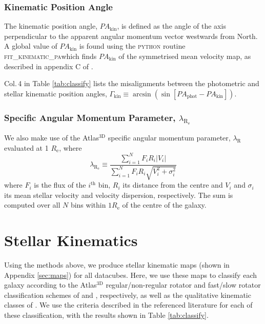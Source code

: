 \documentclass[a4paper,fleqn,usenatbib]{mnras}
\begin{document}
		\subsubsection{Kinematic Position Angle}
			\label{subsubsec:KinPA}
			The kinematic position angle, $PA_\text{kin}$, is defined as the angle of the axis perpendicular to the apparent angular momentum vector westwards from North. A global value of $PA_\text{kin}$ is found using the \textsc{python} routine \textsc{fit\_kinematic\_pa}\footnotemark[1] which finds $PA_\text{kin}$ of the symmetrised mean velocity map, as described in appendix C of \citet{Krajnovic2006}. %

			Col.\,4 in Table \ref{tab:classify} lists the misalignments between the photometric and stellar kinematic position angles, $\Gamma_\text{kin} \equiv \arcsin(\sin[PA_\text{phot} - PA_\text{kin}])$.

		\subsubsection{Specific Angular Momentum Parameter, $\lambda_\mathrm{R_e}$}
			We also make use of the Atlas$^\text{3D}$ specific angular momentum parameter, $\lambda_\text{R}$ \citep{Emsellem2007} evaluated at 1 $R_\text{e}$, where 
			\begin{equation}
				\lambda_\mathrm{R_e} \equiv \frac{\sum_{i=1}^{N} F_i R_i |V_i|}{\sum_{i=1}^{N} F_i R_i \sqrt{V_i^2 + \sigma_i^2}}
			\end{equation}
			where $F_i$ is the flux of the $i^\text{th}$ bin, $R_i$ its distance from the centre and $V_i$ and $\sigma_i$ its mean stellar velocity and velocity dispersion, respectively. The sum is computed over all $N$ bins within $1R_\text{e}$ of the centre of the galaxy.

\section{Stellar Kinematics}
	\label{sec:StarKine}
	Using the methods above, we produce stellar kinematic maps (shown in Appendix \ref{sec:maps}) for all datacubes. Here, we use these maps to classify each galaxy according to the Atlas$^\text{3D}$ regular/non-regular rotator and fast/slow rotator classification schemes of \citet{Krajnovic2006} and \citet{Cappellari2016}, respectively, as well as the qualitative kinematic classes of \citet{Krajnovic2011}. We use the criteria described in the referenced literature for each of these classification, with the results shown in Table \ref{tab:classify}.
\end{document}
